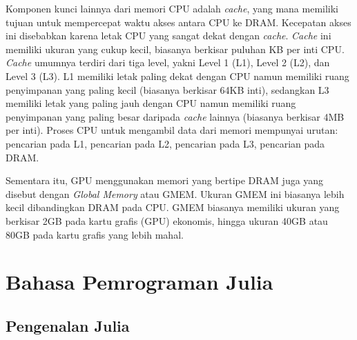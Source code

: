 Komponen kunci lainnya dari memori CPU adalah \emph{cache}, yang mana memiliki tujuan
untuk mempercepat waktu akses antara CPU ke DRAM. Kecepatan akses ini disebabkan
karena letak CPU yang sangat dekat dengan \emph{cache}. \emph{Cache} ini memiliki
ukuran yang cukup kecil, biasanya berkisar puluhan KB per inti CPU. \emph{Cache}
umumnya terdiri dari tiga level, yakni Level 1 (L1), Level 2 (L2), dan Level 3 (L3).
L1 memiliki letak paling dekat dengan CPU namun memiliki ruang penyimpanan yang
paling kecil (biasanya berkisar 64KB inti), sedangkan L3 memiliki letak yang paling
jauh dengan CPU namun memiliki ruang penyimpanan yang paling besar daripada \emph{cache}
lainnya (biasanya berkisar 4MB per inti). Proses CPU untuk mengambil data dari memori
mempunyai urutan: pencarian pada L1, pencarian pada L2, pencarian pada L3, pencarian
pada DRAM.

Sementara itu, GPU menggunakan memori yang bertipe DRAM juga yang disebut dengan
\emph{Global Memory} atau GMEM. Ukuran GMEM ini biasanya lebih kecil
dibandingkan DRAM pada CPU. GMEM biasanya memiliki ukuran yang berkisar 2GB pada
kartu grafis (GPU) ekonomis, hingga ukuran 40GB atau 80GB pada kartu grafis yang
lebih mahal.


\section{Bahasa Pemrograman Julia}

\subsection{Pengenalan Julia}

